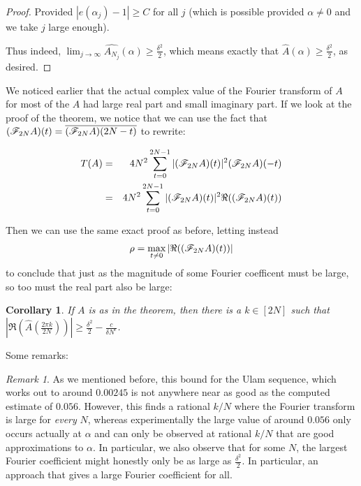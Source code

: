 \documentclass{report}
\newtheorem{corollary}{Corollary}[theorem]
\theoremstyle{remark}
\newtheorem{remark}{Remark}
\numberwithin{equation}{section}
\begin{document}
\begin{proof}
  Provided $|e(\alpha_j) - 1| \geq C$ for all $j$ (which is possible
  provided $\alpha \neq 0$ and we take $j$ large enough).

  Thus indeed,
  $\lim_{j \to \infty} \widehat{A_{N_j}}(\alpha) \geq
  \frac{\delta^2}{2}$, which means exactly that
  $\widehat{A}(\alpha) \geq \frac{\delta^2}{2}$, as desired.
\end{proof}

We noticed earlier that the actual complex value of the Fourier
transform of $A$ for most of the $A$ had large real part and small
imaginary part.  If we look at the proof of the theorem, we notice
that we can use the fact that
$(\mathscr{F}_{2N}A)(t) = \overline{(\mathscr{F}_{2N}A)(2N-t)}$ to rewrite:

\begin{eqnarray*}
T(A) &=& 4 N^2 \sum_{t=0}^{2N-1} |(\mathscr{F}_{2N}A)(t)|^2(\mathscr{F}_{2N}A)(-t)\\
 &=& 4 N^2 \sum_{t=0}^{2N-1} |(\mathscr{F}_{2N}A)(t)|^2\Re((\mathscr{F}_{2N}A)(t))
\end{eqnarray*}

Then we can use the same exact proof as before, letting instead
\[\rho = \max_{t \neq 0} |\Re((\mathscr{F}_{2N}A)(t))|\] to conclude that
just as the magnitude of some Fourier coefficent must be large, so too
must the real part also be large:

\begin{corollary}\label{thm:alpha_real}
  If $A$ is as in the theorem, then there is a $k \in [2N]$ such that
  $|\Re(\widehat{A}(\frac{2\pi k}{2N}))| \geq \frac{\delta^2}{2} -
  \frac{c}{\delta N^\epsilon}$.
\end{corollary}

Some remarks: 

\begin{remark}
  As we mentioned before, this bound for the Ulam sequence, which
  works out to around $0.00245$ is not anywhere near as good as the
  computed estimate of $0.056$.  However, this finds a rational $k/N$
  where the Fourier transform is large for \textit{every} $N$, whereas
  experimentally the large value of around $0.056$ only occurs
  actually at $\alpha$ and can only be observed at rational $k/N$ that
  are good approximations to $\alpha$.  In particular, we also observe
  that for some $N$, the largest Fourier coefficient might honestly
  only be as large as $\frac{\delta^2}{2}$.  In particular, an
  approach that gives a large Fourier coefficient for all.
\end{remark}
\end{document}
